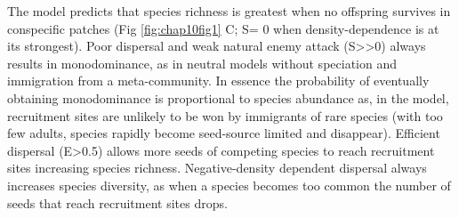 \documentclass[b5paper,justified]{tufte-book} %
\begin{document}
\begin{fullwidth}
{\begin{minipage}{13.5cm}
\hspace{.3cm} The model predicts that species richness is greatest when no offspring survives in conspecific patches (Fig \ref{fig:chap10fig1} C; S= $0$ when density-dependence is at its strongest). Poor dispersal and weak natural enemy attack (S>>$0$) always results in monodominance, as in neutral models without speciation and immigration from a meta-community. In essence the probability of eventually obtaining monodominance is proportional to species abundance as, in the model, recruitment sites are unlikely to be won by immigrants of rare species (with too few adults, species rapidly become seed-source limited and disappear). Efficient dispersal (E>0.5) allows more seeds of competing species to reach recruitment sites increasing species richness. Negative-density dependent dispersal always increases species diversity, as when a species becomes too common the number of seeds that reach recruitment sites drops. 
\end{minipage}
}






\end{fullwidth}
\end{document}
